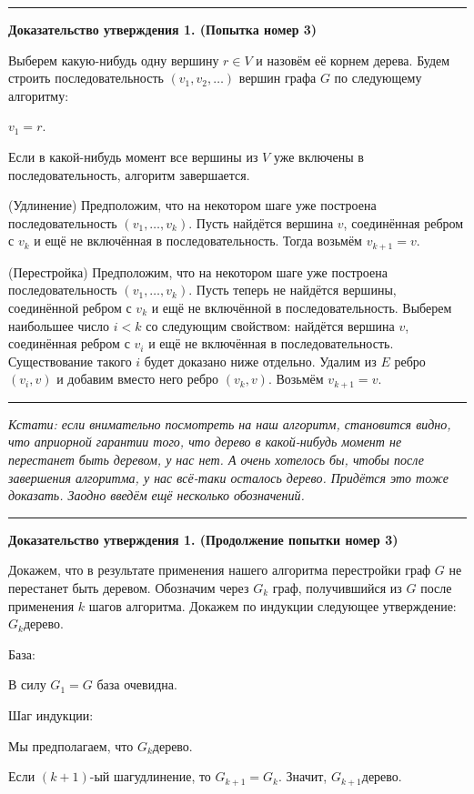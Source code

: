 \documentclass[a4paper,12pt]{article}
\begin{document}
\bigskip
\hrule
\medskip
{\bf Доказательство утверждения 1. (Попытка номер 3)}

Выберем какую-нибудь одну вершину $r \in V$ и назовём её корнем дерева. Будем строить последовательность $(v_1, v_2, \ldots)$ вершин графа $G$ по следующему алгоритму:
\begin{nums}{-3}
\item
\label{start}
$v_1 = r$.
\item
\label{stop}
Если в какой-нибудь момент все вершины из $V$ уже включены в последовательность, алгоритм завершается.
\item
\label{prolongate}
 (Удлинение)
Предположим, что на некотором шаге уже построена последовательность $(v_1, \ldots, v_k)$. Пусть найдётся вершина $v$, соединённая ребром с $v_k$ и ещё не включённая в последовательность. Тогда возьмём $v_{k+1} = v$.
\item
\label{rebuild}
 (Перестройка)
Предположим, что на некотором шаге уже построена последовательность $(v_1, \ldots, v_k)$. Пусть теперь не найдётся вершины, соединённой ребром с $v_k$ и ещё не включённой в последовательность. Выберем наибольшее число $i < k$ со следующим свойством: найдётся вершина $v$, соединённая ребром с $v_i$ и ещё не включённая в последовательность. Существование такого $i$ будет доказано ниже отдельно. Удалим из $E$ ребро $(v_i, v)$ и добавим вместо него ребро $(v_k, v)$. Возьмём $v_{k+1} = v$.
\end{nums}

\medskip
\hrule
\bigskip
\emph{
Кстати: если внимательно посмотреть на наш алгоритм, становится видно, что априорной гарантии того, что дерево в какой-нибудь момент не перестанет быть деревом, у нас нет. А очень хотелось бы, чтобы после завершения алгоритма, у нас всё-таки осталось дерево. Придётся это тоже доказать. Заодно введём ещё несколько обозначений.
}
\bigskip
\hrule
\medskip
{\bf Доказательство утверждения 1. (Продолжение попытки номер 3)}

Докажем, что в результате применения нашего алгоритма перестройки граф $G$ не перестанет быть деревом. Обозначим через $G_k$ граф, получившийся из $G$ после применения $k$ шагов алгоритма. Докажем по индукции следующее утверждение: $G_k$\т дерево.

База:

В силу $G_1 = G$ база очевидна.

Шаг индукции:

Мы предполагаем, что $G_k$\т дерево.

Если $(k+1)$-ый шаг\т удлинение, то $G_{k+1} = G_k$. Значит, $G_{k+1}$\т дерево.
\end{document}
